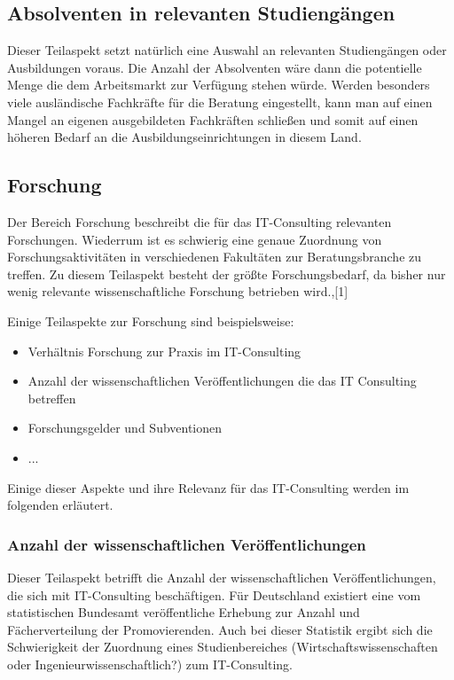\subsection*{Absolventen in relevanten Studiengängen}
Dieser Teilaspekt setzt natürlich eine Auswahl an relevanten Studiengängen oder Ausbildungen voraus. Die Anzahl der Absolventen wäre dann die potentielle Menge die dem Arbeitsmarkt zur Verfügung stehen würde. Werden besonders viele ausländische Fachkräfte für die Beratung eingestellt, kann man auf einen Mangel an eigenen ausgebildeten Fachkräften schließen und somit auf einen höheren Bedarf an die Ausbildungseinrichtungen in diesem Land.

\subsection*{Forschung}
Der Bereich Forschung beschreibt die für das IT-Consulting relevanten Forschungen. Wiederrum ist es schwierig eine genaue Zuordnung von Forschungsaktivitäten in verschiedenen Fakultäten zur Beratungsbranche zu treffen. Zu diesem Teilaspekt besteht der größte Forschungsbedarf, da bisher nur wenig relevante wissenschaftliche Forschung betrieben wird.\cite[10]{nissen2007consulting},\cite{IDSScheer}[1]

Einige Teilaspekte zur Forschung sind beispielsweise:
\begin{itemize}
\item Verhältnis Forschung zur Praxis im IT-Consulting
\item Anzahl der wissenschaftlichen Veröffentlichungen die das IT Consulting betreffen
\item Forschungsgelder und Subventionen
\item ...
\end{itemize}

Einige dieser Aspekte und ihre Relevanz für das IT-Consulting werden im folgenden erläutert.

\subsubsection*{Anzahl der wissenschaftlichen Veröffentlichungen}
Dieser Teilaspekt betrifft die Anzahl der wissenschaftlichen Veröffentlichungen, die sich mit IT-Consulting beschäftigen. 
Für Deutschland existiert eine vom statistischen Bundesamt veröffentliche Erhebung zur Anzahl und Fächerverteilung der Promovierenden.\cite{destatis}
Auch bei dieser Statistik ergibt sich die Schwierigkeit der Zuordnung eines Studienbereiches (Wirtschaftswissenschaften oder Ingenieurwissenschaftlich?) zum IT-Consulting. 

